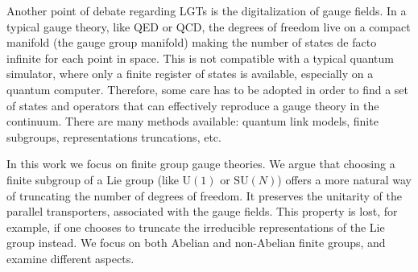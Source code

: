 Another point of debate regarding LGTs is the digitalization of gauge fields.
In a typical gauge theory, like QED or QCD, the degrees of freedom live on a compact manifold (the gauge group manifold) making the number of states de facto infinite for each point in space.
This is not compatible with a typical quantum simulator, where only a finite register of states is available, especially on a quantum computer.
Therefore, some care has to be adopted in order to find a set of states and operators that can effectively reproduce a gauge theory in the continuum.
There are many methods available: quantum link models, finite subgroups, representations truncations, etc.

\bigskip

In this work we focus on finite group gauge theories.
We argue that choosing a finite subgroup of a Lie group (like $\mathrm{U}(1)$ or $\mathrm{SU}(N)$) offers a more natural way of truncating the number of degrees of freedom.
It preserves the unitarity of the parallel transporters, associated with the gauge fields.
This property is lost, for example, if one chooses to truncate the irreducible representations of the Lie group instead.
We focus on both Abelian \cite{pradhan2022ladder} and non-Abelian \cite{pradhan_unpublished} finite groups, and examine different aspects.

\bigskip

